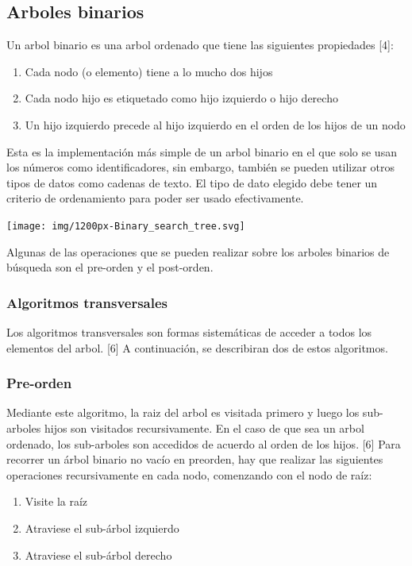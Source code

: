 \documentclass[twoside,twocolumn]{article}
\begin{document}
\subsection{Arboles binarios}
Un arbol binario es una arbol ordenado que tiene las siguientes propiedades [4]:

\begin{enumerate}
  \item Cada nodo (o elemento) tiene a lo mucho dos hijos
  \item Cada nodo hijo es etiquetado como hijo izquierdo o hijo derecho
  \item Un hijo izquierdo precede al hijo izquierdo en el orden de los hijos de un nodo
\end{enumerate}

Esta es la implementación más simple de un arbol binario en el que solo se usan los números como identificadores, sin embargo, también se pueden utilizar otros tipos de datos como cadenas de texto. El tipo de dato elegido debe tener un criterio de ordenamiento para poder ser usado efectivamente.

\texttt{[image: img/1200px-Binary\_search\_tree.svg]}

Algunas de las operaciones que se pueden realizar sobre los arboles binarios de búsqueda son el pre-orden y el post-orden.

\subsubsection{Algoritmos transversales}

Los algoritmos transversales son formas sistemáticas de acceder a todos los elementos del arbol. [6]
A continuación, se describiran dos de estos algoritmos.

\subsubsection{Pre-orden}

Mediante este algoritmo, la raiz del arbol es visitada primero y luego los sub-arboles hijos son visitados recursivamente. En el caso de que sea un arbol ordenado, los sub-arboles son accedidos de acuerdo al orden de los hijos. [6]
Para recorrer un árbol binario no vacío en preorden, hay que realizar las siguientes operaciones recursivamente en cada nodo, comenzando con el nodo de raíz:

\begin{enumerate}
  \item Visite la raíz
  \item Atraviese el sub-árbol izquierdo
  \item Atraviese el sub-árbol derecho
\end{enumerate}
\end{document}
